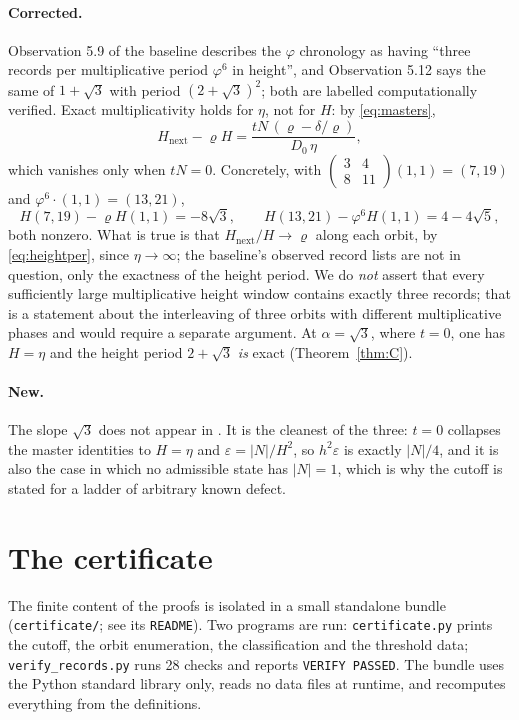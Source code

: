 \documentclass[11pt]{article}
\theoremstyle{definition}
\theoremstyle{remark}
\newcommand{\pr}{\varrho}
\newcommand{\mat}[4]{\left(\begin{smallmatrix}#1&#2\\#3&#4\end{smallmatrix}\right)}
\begin{document}
\paragraph{Corrected.}
Observation 5.9 of the baseline describes the $\varphi$ chronology as having ``three records
per multiplicative period $\varphi^6$ in height'', and Observation 5.12 says the same of
$1+\sqrt3$ with period $(2+\sqrt3)^2$; both are labelled computationally verified. Exact
multiplicativity holds for $\eta$, not for $H$: by \eqref{eq:masters},
\begin{equation}\label{eq:heightper}
H_{\mathrm{next}}-\pr H=\frac{tN\,(\pr-\delta/\pr)}{D_0\,\eta},
\end{equation}
which vanishes only when $tN=0$. Concretely, with $\mat{3}{4}{8}{11}(1,1)=(7,19)$ and
$\varphi^6\cdot(1,1)=(13,21)$,
\[
H(7,19)-\pr H(1,1)=-8\sqrt3,\qquad
H(13,21)-\varphi^6H(1,1)=4-4\sqrt5,
\]
both nonzero. What is true is that $H_{\mathrm{next}}/H\to\pr$ along each orbit, by
\eqref{eq:heightper}, since $\eta\to\infty$; the baseline's observed record lists are not in
question, only the exactness of the height period. We do \emph{not} assert that every sufficiently large multiplicative height
window contains exactly three records; that is a statement about the interleaving of three
orbits with different multiplicative phases and would require a separate argument. At
$\alpha=\sqrt3$, where $t=0$, one has $H=\eta$ and the height period $2+\sqrt3$ \emph{is} exact
(Theorem~\ref{thm:C}).

\paragraph{New.}
The slope $\sqrt3$ does not appear in \cite{DeJesus2026}. It is the cleanest of the three: $t=0$
collapses the master identities to $H=\eta$ and $\varepsilon=|N|/H^2$, so $h^2\varepsilon$ is
exactly $|N|/4$, and it is also the case in which no admissible state has $|N|=1$, which is why
the cutoff is stated for a ladder of arbitrary known defect.

\section{The certificate}\label{sec:cert}

The finite content of the proofs is isolated in a small standalone bundle
(\texttt{certificate/}; see its \texttt{README}). Two programs are run:
\texttt{certificate.py} prints the cutoff, the orbit enumeration, the classification and the
threshold data; \texttt{verify\_records.py} runs 28 checks and reports \texttt{VERIFY PASSED}.
The bundle uses the Python standard library only, reads no data files at runtime, and
recomputes everything from the definitions.
\end{document}
